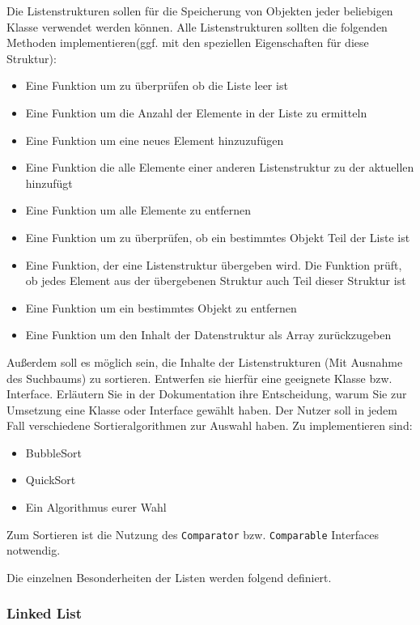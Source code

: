 \documentclass[a4paper,
			   fontsize=12pt]{article}
\begin{document}
Die Listenstrukturen sollen für die Speicherung von Objekten jeder beliebigen Klasse verwendet werden können. Alle Listenstrukturen sollten die folgenden Methoden
implementieren(ggf. mit den speziellen Eigenschaften für diese Struktur):
\begin{itemize}
	\item Eine Funktion um zu überprüfen ob die Liste leer ist
	\item Eine Funktion um die Anzahl der Elemente in der Liste zu ermitteln
	\item Eine Funktion um eine neues Element hinzuzufügen
	\item Eine Funktion die alle Elemente einer anderen Listenstruktur zu der aktuellen hinzufügt
	\item Eine Funktion um alle Elemente zu entfernen
	\item Eine Funktion um zu überprüfen, ob ein bestimmtes Objekt Teil der Liste ist
	\item Eine Funktion, der eine Listenstruktur übergeben wird. Die Funktion prüft, ob jedes Element aus der übergebenen Struktur auch Teil dieser Struktur ist
	\item Eine Funktion um ein bestimmtes Objekt zu entfernen
	\item Eine Funktion um den Inhalt der Datenstruktur als Array zurückzugeben
\end{itemize}

Außerdem soll es möglich sein, die Inhalte der Listenstrukturen (Mit Ausnahme des Suchbaums) zu sortieren. Entwerfen sie hierfür eine geeignete Klasse bzw. Interface. 
Erläutern Sie in der Dokumentation ihre Entscheidung, warum Sie zur Umsetzung eine Klasse oder Interface gewählt haben. Der Nutzer soll in jedem Fall verschiedene
Sortieralgorithmen zur Auswahl haben. Zu implementieren sind:
\begin{itemize}
	\item BubbleSort
	\item QuickSort
	\item Ein Algorithmus eurer Wahl
\end{itemize}
Zum Sortieren ist die Nutzung des \texttt{Comparator} bzw. \texttt{Comparable} Interfaces notwendig.

Die einzelnen Besonderheiten der Listen werden folgend definiert.

\subsubsection*{Linked List}
\end{document}
